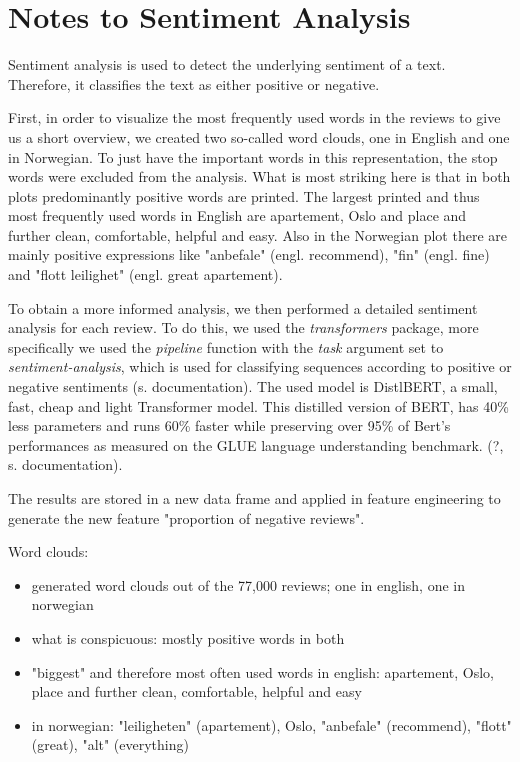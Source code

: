 \documentclass[12pt, letterpaper]{article}
\begin{document}
\section*{Notes to Sentiment Analysis}


Sentiment analysis is used to detect the underlying sentiment of a text. Therefore, it classifies
the text as either positive or negative. 

First, in order to visualize the most frequently used words in the reviews to give us a short overview, 
we created two so-called word clouds, one in English and one in Norwegian. To just have the important words 
in this representation, the stop words were
excluded from the analysis. What is most striking here is that in both plots 
predominantly positive words are printed.
The largest printed and thus most frequently used words in English are apartement, Oslo and place and 
further clean, comfortable, helpful and easy. Also in the Norwegian plot there are mainly positive expressions like
"anbefale" (engl. recommend), "fin" (engl. fine) and "flott leilighet" (engl. great apartement).

To obtain a more informed analysis, we then performed a detailed sentiment analysis for each review.
To do this, we used the \textit{transformers} package, more specifically we used the \textit{pipeline} function 
with the \textit{task} argument set to \textit{sentiment-analysis}, which is used for classifying sequences
according to positive or negative sentiments (s. documentation). The used model is DistlBERT, 
a small, fast, cheap and light Transformer model. This distilled version of BERT, has 40\% 
less parameters and runs 60\% faster while preserving over 95\% of Bert's performances as 
measured on the GLUE language understanding benchmark. (?, s. documentation).

The results are stored in a new data frame and applied in feature engineering to generate the
new feature "proportion of negative reviews". 





\newpage
Word clouds:

\begin{itemize}
    \item generated word clouds out of the 77,000 reviews; one in english, one in norwegian
    \item what is conspicuous: mostly positive words in both
    \item "biggest" and therefore most often used words in english: apartement, Oslo, place and further clean, comfortable, 
    helpful and easy
    \item in norwegian: "leiligheten" (apartement), Oslo, "anbefale" (recommend), "flott" (great), "alt" (everything)
\end{itemize}
\end{document}
